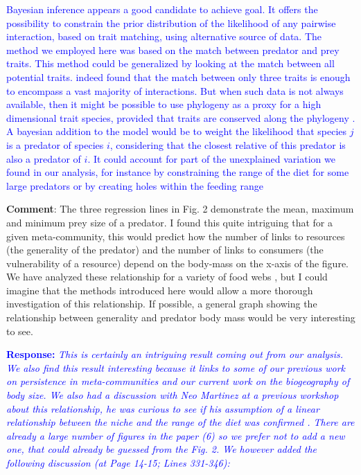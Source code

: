 \documentclass [12pt,onecolumn,twoside,openright]{report}
\begin{document}
\begin{onehalfspacing}
\medskip \textcolor{blue}{Bayesian inference appears a good candidate to achieve goal. It
offers the possibility to constrain the prior distribution of the likelihood of
any pairwise interaction, based on trait matching, using alternative source of
data. The method we employed here was based on the match between predator and
prey traits. This method could be generalized by looking at the match between
all potential traits. \textcite{Eklof2013} indeed found that the match between
only three traits is enough to encompass a vast majority of interactions. But
when such data is not always available, then it might be possible to use
phylogeny as a proxy for a high dimensional trait species, provided that traits
are conserved along the phylogeny \parencite{Mouquet2012}. A bayesian addition
to the model would be to weight the likelihood that species $j$ is a predator of
species $i$, considering that the closest relative of this predator is also a
predator of $i$. It could account for part of the unexplained variation we found
in our analysis, for instance by constraining the range of the diet for some
large predators or by creating holes within the feeding range
\parencite{Rall2011}}

\medskip \textbf{Comment}: The three regression lines in Fig.
2 demonstrate the mean, maximum and minimum prey size of a predator. I found
this quite intriguing that for a given meta-community, this would predict how
the number of links to resources (the generality of the predator) and the number
of links to consumers (the vulnerability of a resource) depend on the body-mass
on the x-axis of the figure. We have analyzed these relationship for a variety
of food webs \parencite{Digel2011}, but I could imagine that the methods
introduced here would allow a more thorough investigation of this relationship.
If possible, a general graph showing the relationship between generality and
predator body mass would be very interesting to see.

\medskip \textcolor{blue}{\textbf{Response:}} \textit{\textcolor{blue}{This is certainly an intriguing result coming out from our analysis. We also find this result interesting because it links to some of our previous work on persistence in meta-communities and our current work on the biogeography of body size. We also had a discussion with Neo Martinez at a previous workshop about this relationship, he was curious to see if his assumption of a linear relationship between the niche and the range of the diet was confirmed  \parencite{Williams2000}. There are already a large number of figures in the paper (6) so we prefer not to add a new one, that could already be guessed from the Fig. 2. We however added the following discussion (at Page 14-15; Lines 331-346):}}


\end{onehalfspacing}
\end{document}
